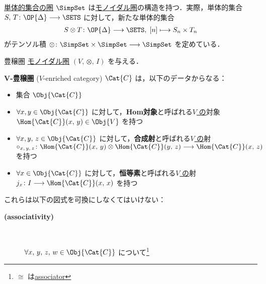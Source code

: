 \documentclass[TQFT_main]{subfiles}
\begin{document}
\hyperref[def:simplicial-sets]{単体的集合の圏} $\SimpSet$ は\hyperref[def:monoidal-category]{モノイダル圏}の構造を持つ．実際，単体的集合 $S,\, T \colon \OP{\Delta} \lto \SETS$ に対して，新たな単体的集合
\begin{align}
    S \otimes T \colon \OP{\Delta} \lto \SETS,\; [n] \lmto S_n \times T_n
\end{align}
がテンソル積 $\otimes \colon \SimpSet \times \SimpSet \lto \SimpSet$ を定めている．

\begin{mydef}[label=def:enriched,breakable]{豊穣圏}
    \hyperref[def:monoidal-category]{モノイダル圏} $(V,\, \otimes,\, I)$ を与える．

    $\bm{V}$\textbf{-豊穣圏} ($V$-enriched category) $\Cat{C}$ は，以下のデータからなる：
    \begin{itemize}
        \item 集合 $\Obj{\Cat{C}}$
        \item $\forall x, y \in \Obj{\Cat{C}}$ に対して，\textbf{Hom対象}と呼ばれる\underline{$V$ の}対象 $\Hom{\Cat{C}}(x,\, y) \in \Obj{V}$ を持つ
        \item $\forall x, y,\, z \in \Obj{\Cat{C}}$ に対して，\textbf{合成射}と呼ばれる\underline{$V$ の}射 $\circ_{x,\, y,\, z} \colon \Hom{\Cat{C}}(x,\, y) \otimes \Hom{\Cat{C}}(y,\, z) \lto \Hom{\Cat{C}} (x,\, z)$ を持つ
        \item $\forall x \in \Obj{\Cat{C}}$ に対して，\textbf{恒等素}と呼ばれる\underline{$V$ の}射 $j_x \colon I \lto \Hom{\Cat{C}} (x,\, x)$ を持つ
    \end{itemize}
    これらは以下の図式を可換にしなくてはいけない：
    \begin{description}
        \item[\textbf{(associativity)}]　
        
        $\forall x,\, y,\, z,\, w \in \Obj{\Cat{C}}$ について\footnote{$\cong$ は\hyperref[def:monoidal-category]{associator}}
        \begin{center}
        \end{center}
        

\end{description}
\end{mydef}
\end{document}

